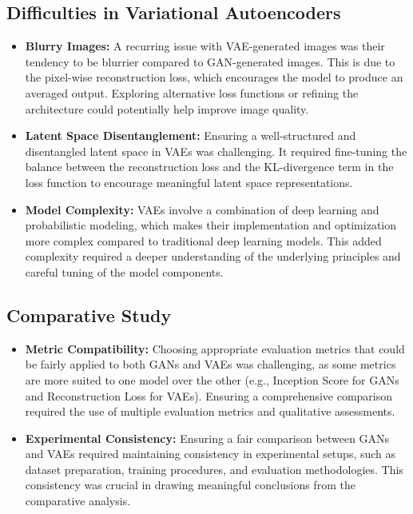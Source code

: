 \documentclass{article}
\begin{document}
\subsection{Difficulties in Variational Autoencoders}
\begin{itemize}
    \item \textbf{Blurry Images:} A recurring issue with VAE-generated images was their tendency to be blurrier compared to GAN-generated images. This is due to the pixel-wise reconstruction loss, which encourages the model to produce an averaged output. Exploring alternative loss functions or refining the architecture could potentially help improve image quality.
    \item \textbf{Latent Space Disentanglement:} Ensuring a well-structured and disentangled latent space in VAEs was challenging. It required fine-tuning the balance between the reconstruction loss and the KL-divergence term in the loss function to encourage meaningful latent space representations.
    \item \textbf{Model Complexity:} VAEs involve a combination of deep learning and probabilistic modeling, which makes their implementation and optimization more complex compared to traditional deep learning models. This added complexity required a deeper understanding of the underlying principles and careful tuning of the model components.
\end{itemize}

\subsection{Comparative Study}
\begin{itemize}
    \item \textbf{Metric Compatibility:} Choosing appropriate evaluation metrics that could be fairly applied to both GANs and VAEs was challenging, as some metrics are more suited to one model over the other (e.g., Inception Score for GANs and Reconstruction Loss for VAEs). Ensuring a comprehensive comparison required the use of multiple evaluation metrics and qualitative assessments.
    \item \textbf{Experimental Consistency:} Ensuring a fair comparison between GANs and VAEs required maintaining consistency in experimental setups, such as dataset preparation, training procedures, and evaluation methodologies. This consistency was crucial in drawing meaningful conclusions from the comparative analysis.
\end{itemize}
\end{document}
